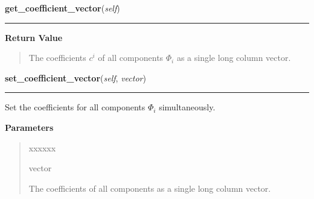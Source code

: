 \hspace{.8\funcindent}\begin{boxedminipage}{\funcwidth}

    \raggedright \textbf{get\_coefficient\_vector}(\textit{self})

    \vspace{-1.5ex}

    \rule{\textwidth}{0.5\fboxrule}
\setlength{\parskip}{2ex}
\setlength{\parskip}{1ex}
      \textbf{Return Value}
    \vspace{-1ex}

      \begin{quote}
      The coefficients $c^i$ of all components
      $\Phi_i$ as a single long column vector.

      \end{quote}

    \end{boxedminipage}

    \label{HagedornWavepacket:HagedornWavepacket:set_coefficient_vector}

    \vspace{0.5ex}

\hspace{.8\funcindent}\begin{boxedminipage}{\funcwidth}

    \raggedright \textbf{set\_coefficient\_vector}(\textit{self}, \textit{vector})

    \vspace{-1.5ex}

    \rule{\textwidth}{0.5\fboxrule}
\setlength{\parskip}{2ex}
    Set the coefficients for all components $\Phi_i$
    simultaneously.

\setlength{\parskip}{1ex}
      \textbf{Parameters}
      \vspace{-1ex}

      \begin{quote}
        \begin{Ventry}{xxxxxx}

          \item[vector]

          The coefficients of all components as a single long column
          vector.

        \end{Ventry}

      \end{quote}

    \end{boxedminipage}

